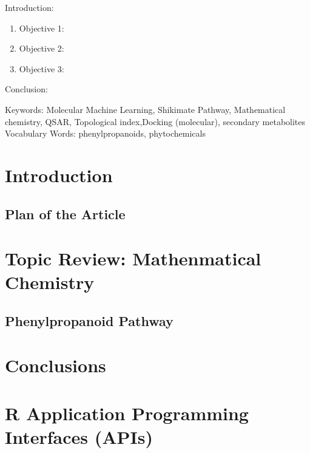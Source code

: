 

\twocolumn
\scriptsize
\begin{frontmatter}
		\title{}
		\author{}
		\address{The Mathematical Learning Space}
\end{frontmatter}	

Introduction:
\begin{enumerate}
\item Objective 1:
\item Objective 2:
\item Objective 3:
\end{enumerate}
Conclusion:

Keywords:  Molecular Machine Learning, Shikimate Pathway, Mathematical chemistry, QSAR, Topological index,Docking (molecular), secondary  metabolites
Vocabulary Words: phenylpropanoids, phytochemicals

\section{Introduction}


\subsection{Plan of the Article}

\section{Topic Review: Mathenmatical Chemistry}


\subsection{Phenylpropanoid Pathway}


\section{Conclusions}


\section{R Application Programming Interfaces (APIs)}




